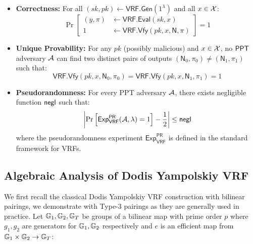\begin{itemize}
    \item \textbf{Correctness:} For all $(sk, pk) \gets \mathsf{VRF.Gen}(1^\lambda)$ and all $x \in \mathcal{X}$:
    \[
    \Pr\left[\begin{aligned}
        (y, \pi) &\gets \mathsf{VRF.Eval}(sk, x) \\
        1 &\gets \mathsf{VRF.Vfy}(pk, x, \textsf{N}, \pi)
    \end{aligned}\right] = 1
    \]

    \item \textbf{Unique Provability:} For any $pk$ (possibly malicious) and $x \in \mathcal{X}$, no $\mathsf{PPT}$ adversary $\mathcal{A}$ can find two distinct pairs of outputs $(\textsf{N}_0, \pi_0) \neq (\textsf{N}_1, \pi_1)$ such that:
    \[
    \mathsf{VRF.Vfy}(pk, x, \textsf{N}_0, \pi_0) = \mathsf{VRF.Vfy}(pk, x, \textsf{N}_1, \pi_1) = 1
    \]

    \item \textbf{Pseudorandomness:} For every PPT adversary $\mathcal{A}$, there exists negligible function $\mathsf{negl}$ such that:
    \[
    \left|\Pr\left[\mathsf{Exp}_{\mathsf{VRF}}^{\mathsf{PR}}(\mathcal{A}, \lambda) = 1\right] - \frac{1}{2}\right| \leq \mathsf{negl}
    \]
    where the pseudorandomness experiment $\mathsf{Exp}_{\mathsf{VRF}}^{\mathsf{PR}}$ is defined in the standard framework for VRFs.
\end{itemize}


\subsection{Algebraic Analysis of Dodis Yampolskiy VRF}
We first recall the classical Dodis Yampolskiy VRF construction with bilinear pairings, we demonstrate with Type-3 pairings as they are generally used in practice. Let $\mathbb{G}_1, \mathbb{G}_2, \mathbb{G}_T$ be groups of a bilinear map with prime order $p$ where $g_1, g_2$ are generators for $\mathbb{G}_1, \mathbb{G}_2$ respectively and $e$ is an efficient map from $\mathbb{G}_1 \times \mathbb{G}_2 \to \mathbb{G}_T$:

    
    

